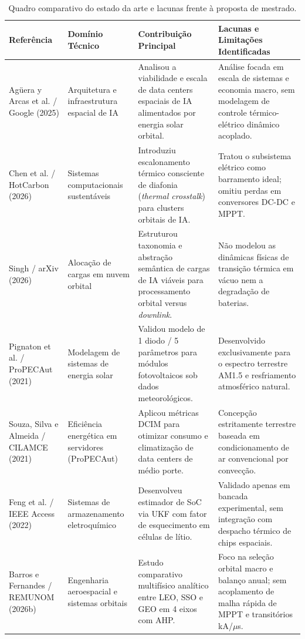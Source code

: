 \begin{table}[!htbp]
\centering
\scriptsize
\renewcommand{\arraystretch}{1.05}
\caption{Quadro comparativo do estado da arte e lacunas frente à proposta de mestrado.}
\begin{tabularx}{\textwidth}{p{3.0cm} p{2.9cm} X p{3.4cm}}
\toprule
\textbf{Referência} & \textbf{Domínio Técnico} & \textbf{Contribuição Principal} & \textbf{Lacunas e Limitações Identificadas} \\
\midrule
Agüera y Arcas et al. / Google (2025) & Arquitetura e infraestrutura espacial de IA & Analisou a viabilidade e escala de data centers espaciais de IA alimentados por energia solar orbital. & Análise focada em escala de sistemas e economia macro, sem modelagem de controle térmico-elétrico dinâmico acoplado. \\
\addlinespace
Chen et al. / HotCarbon (2026) & Sistemas computacionais sustentáveis & Introduziu escalonamento térmico consciente de diafonia (\textit{thermal crosstalk}) para clusters orbitais de IA. & Tratou o subsistema elétrico como barramento ideal; omitiu perdas em conversores DC-DC e MPPT. \\
\addlinespace
Singh / arXiv (2026) & Alocação de cargas em nuvem orbital & Estruturou taxonomia e abstração semântica de cargas de IA viáveis para processamento orbital versus \textit{downlink}. & Não modelou as dinâmicas físicas de transição térmica em vácuo nem a degradação de baterias. \\
\addlinespace
Pignaton et al. / ProPECAut (2021) & Modelagem de sistemas de energia solar & Validou modelo de 1 diodo / 5 parâmetros para módulos fotovoltaicos sob dados meteorológicos. & Desenvolvido exclusivamente para o espectro terrestre AM1.5 e resfriamento atmosférico natural. \\
\addlinespace
Souza, Silva e Almeida / CILAMCE (2021) & Eficiência energética em servidores (ProPECAut) & Aplicou métricas DCIM para otimizar consumo e climatização de data centers de médio porte. & Concepção estritamente terrestre baseada em condicionamento de ar convencional por convecção. \\
\addlinespace
Feng et al. / IEEE Access (2022) & Sistemas de armazenamento eletroquímico & Desenvolveu estimador de SoC via UKF com fator de esquecimento em células de lítio. & Validado apenas em bancada experimental, sem integração com despacho térmico de chips espaciais. \\
\addlinespace
Barros e Fernandes / REMUNOM (2026b) & Engenharia aeroespacial e sistemas orbitais & Estudo comparativo multifísico analítico entre LEO, SSO e GEO em 4 eixos com AHP. & Foco na seleção orbital macro e balanço anual; sem acoplamento de malha rápida de MPPT e transitórios kA/$\mu$s. \\

\end{tabularx}
\end{table}
